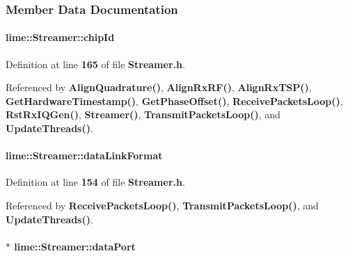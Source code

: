 \subsubsection{Member Data Documentation}
\paragraph[{chip\+Id}]{ lime\+::\+Streamer\+::chip\+Id\hspace{0.3cm}{\ttfamily [private]}}\label{classlime_1_1Streamer_abefd7afb714673aa37ebb56132571e7f}


Definition at line {\bf 165} of file {\bf Streamer.\+h}.



Referenced by {\bf Align\+Quadrature()}, {\bf Align\+Rx\+R\+F()}, {\bf Align\+Rx\+T\+S\+P()}, {\bf Get\+Hardware\+Timestamp()}, {\bf Get\+Phase\+Offset()}, {\bf Receive\+Packets\+Loop()}, {\bf Rst\+Rx\+I\+Q\+Gen()}, {\bf Streamer()}, {\bf Transmit\+Packets\+Loop()}, and {\bf Update\+Threads()}.

\paragraph[{data\+Link\+Format}]{ lime\+::\+Streamer\+::data\+Link\+Format}\label{classlime_1_1Streamer_a4d54c12664e65d2cceae1428e2d7d7fe}


Definition at line {\bf 154} of file {\bf Streamer.\+h}.



Referenced by {\bf Receive\+Packets\+Loop()}, {\bf Transmit\+Packets\+Loop()}, and {\bf Update\+Threads()}.

\paragraph[{data\+Port}]{$\ast$ lime\+::\+Streamer\+::data\+Port}\label{classlime_1_1Streamer_a7282280d633007bb7fd2d1e27a698ae7}


